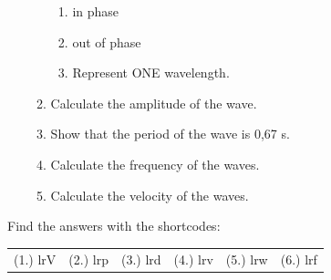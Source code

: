 \begin{enumerate}[noitemsep, label=\textbf{\arabic*}. ]
\begin{enumerate}[noitemsep, label=\textbf{\alph*}. ]
\label{m38806*uid0821323}\begin{enumerate}[noitemsep, label=\textbf{\roman*}. ] 
            \item in phase\item out of phase\item Represent ONE wavelength.\end{enumerate}
        \item Calculate the amplitude of the wave.\item Show that the period of the wave is 0,67 s.\item Calculate the frequency of the waves.\item Calculate the velocity of the waves.\end{enumerate}
         \end{enumerate}
  \label{m38806**end}
\par {} Find the answers with the shortcodes:
 \par \begin{tabular}[h]{cccccc}
 (1.) lrV  &  (2.) lrp  &  (3.) lrd  &  (4.) lrv  &  (5.) lrw  &  (6.) lrf  & \end{tabular}
